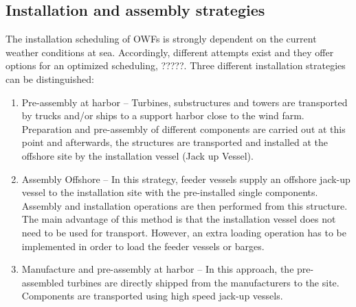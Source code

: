 \subsection{Installation and assembly strategies}
The installation scheduling of OWFs is strongly dependent on the current weather conditions at sea. Accordingly, different attempts exist and they offer options for an optimized scheduling, ?????. Three different installation strategies can be distinguished:

\begin{enumerate}
\item Pre-assembly at harbor -- Turbines, substructures and towers are transported by trucks and/or ships to a support harbor close to the wind farm. Preparation and pre-assembly of different components are carried out at this point and afterwards, the structures are transported and installed at the offshore site by the installation vessel (Jack up Vessel).
\item Assembly Offshore -- In this strategy, feeder vessels supply an offshore jack-up vessel to the installation site with the pre-installed single components. Assembly and installation operations are then performed from this structure. The main advantage of this method is that the installation vessel does not need to be used for transport. However, an extra loading operation has to be implemented in order to load the feeder vessels or barges.
\item Manufacture and pre-assembly at harbor -- In this approach, the pre-assembled turbines are directly shipped from the manufacturers to the site. Components are transported using high speed jack-up vessels.
\end{enumerate}